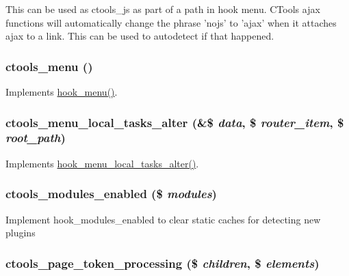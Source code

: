 This can be used as ctools\_\-js as part of a path in hook menu. CTools ajax functions will automatically change the phrase 'nojs' to 'ajax' when it attaches ajax to a link. This can be used to autodetect if that happened. \hypertarget{ctools_8module_a2385dc0b63f4409bfda5056b1954c6d5}{
\subsubsection[{ctools\_\-menu}]{\setlength{\rightskip}{0pt plus 5cm}ctools\_\-menu ()}}
\label{ctools_8module_a2385dc0b63f4409bfda5056b1954c6d5}
Implements \hyperlink{group__hooks_ga5c95244fea59b25666e409759e133ded}{hook\_\-menu()}. \hypertarget{ctools_8module_a943750c628ffe3a20ece880e15a34240}{
\subsubsection[{ctools\_\-menu\_\-local\_\-tasks\_\-alter}]{\setlength{\rightskip}{0pt plus 5cm}ctools\_\-menu\_\-local\_\-tasks\_\-alter (\&\$ {\em data}, \/  \$ {\em router\_\-item}, \/  \$ {\em root\_\-path})}}
\label{ctools_8module_a943750c628ffe3a20ece880e15a34240}
Implements \hyperlink{group__hooks_gac828fb6b28f1a8bb01c444a9b2331f5f}{hook\_\-menu\_\-local\_\-tasks\_\-alter()}. \hypertarget{ctools_8module_aaad6f0b6ff8fd26cc15837b2f9620c98}{
\subsubsection[{ctools\_\-modules\_\-enabled}]{\setlength{\rightskip}{0pt plus 5cm}ctools\_\-modules\_\-enabled (\$ {\em modules})}}
\label{ctools_8module_aaad6f0b6ff8fd26cc15837b2f9620c98}
Implement hook\_\-modules\_\-enabled to clear static caches for detecting new plugins \hypertarget{ctools_8module_ada3893e7993e19022048e2b47b413baa}{
\subsubsection[{ctools\_\-page\_\-token\_\-processing}]{\setlength{\rightskip}{0pt plus 5cm}ctools\_\-page\_\-token\_\-processing (\$ {\em children}, \/  \$ {\em elements})}}
